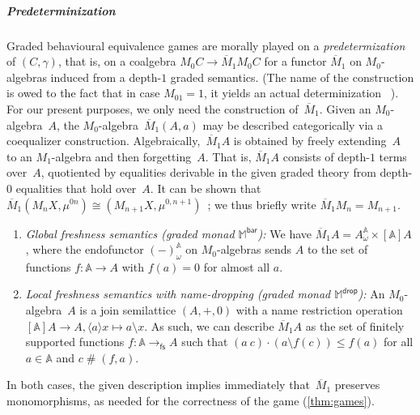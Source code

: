 \documentclass[a4paper,UKenglish,cleveref,thm-restate,numberwithinsect,final]{lipics-v2021}
\newcommand{\Br}{\mathsf{bar}}
\newcommand{\drop}{\mathsf{drop}}
\newcommand{\fs}{\mathsf{fs}}
\newcommand{\Names}{\mathbb{A}}
\newcommand{\fresh}{\mathbin{\#}}
\newcommand{\bind}[1]{\langle #1\rangle}
\newcommand{\mbar}{\overline{M}_1}
\theoremstyle{plain}
\numberwithin{equation}{section}
\newcommand{\monad}{{\mathbb{M}}}
\newcommand{\+}[1]{\mathcal{#1}\xspace}
\theoremstyle{definition}
\begin{document}
\subparagraph*{Predeterminization} Graded behavioural equivalence
games are morally played on a \emph{predetermization} of $(C,\gamma)$,
that is, on a coalgebra $M_0C\to\mbar M_0C$ for a functor $\mbar$ on
$M_0$-algebras induced from a depth-$1$ graded semantics. (The name of
the construction is owed to the fact that in case $M_01=1$, it yields
an actual determinization%
~\cite{FordEA22}). For our present purposes, we only need the
construction of~$\mbar$. Given an $M_0$-algebra~$A$, the
$M_0$-algebra~$\mbar(A,a)$ may be described categorically via a
coequalizer construction. %
Algebraically,~$\mbar A$ is obtained by freely extending~$A$ to an
$M_1$-algebra and then forgetting~$A$. That is, $\mbar A$ consists of
depth-$1$ terms over~$A$, quotiented by equalities derivable in the
given graded theory from depth-$0$ equalities that hold over~$A$. It can be shown that
$\mbar(M_nX,\mu^{0n})\cong(M_{n+1}X,\mu^{0,n+1})$~\cite{FordEA22}; we thus
briefly write $\mbar M_n=M_{n+1}$.

\begin{example}
  \label{exp:m1-bar}
  \begin{enumerate}[wide]
  \item \label{item:m1-bar-global-freshness} \emph{Global freshness
      semantics (graded monad\/ $\monad^\Br$):} We have
    \(\mbar A = A^{\Names}_\omega \times [\Names]A\), where the
    endofunctor \((-)^{\Names}_\omega\) on $M_0$-algebras sends \(A\)
    to the set of functions \(f \colon \Names \to A\) with
    \(f(a) = 0\) for almost all \(a\).
  \item \label{item:m1-bar-local-freshness} \emph{Local freshness
      semantics with name-dropping (graded monad\/ $\monad^\drop$):} An
    \(M_0\)-algebra~\(A\) is a join semilattice $(A,+,0)$ with a name
    restriction operation
    \([\Names]A \to A, \bind{a}x \mapsto a \setminus x\).  As such, we
    can describe \(\mbar A\) as the set of finitely supported
    functions \(f\colon \Names \to_\fs A\) such that
    \((a\ c) \cdot (a \setminus f(c))\le f(a) \) for all
    \(a \in \Names\) and \(c \fresh (f, a)\). %

    \end{enumerate}
    In both cases, the given description
    implies immediately that~$\mbar$ preserves monomorphisms, as
    needed for the correctness of the game (\cref{thm:games}).
\end{example}
\end{document}

